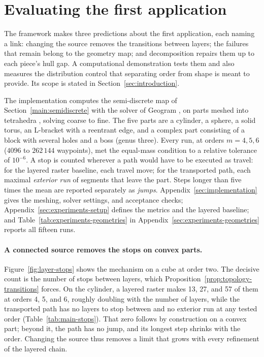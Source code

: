 \section{Evaluating the first application}
\label{main:evidence}

The framework makes three predictions about the first application, each naming a link: changing the source removes the transitions between layers; the failures that remain belong to the geometry map; and decomposition repairs them up to each piece's hull gap. A computational demonstration tests them and also measures the distribution control that separating order from shape is meant to provide. Its scope is stated in Section~\ref{sec:introduction}.

The implementation computes the semi-discrete map of Section~\ref{main:semidiscrete} with the solver of Geogram \cite{levy2015numerical,kitagawa2019convergence}, on parts meshed into tetrahedra \cite{si2015tetgen}, solving coarse to fine. The five parts are a cylinder, a sphere, a solid torus, an L-bracket with a reentrant edge, and a complex part consisting of a block with several holes and a boss (genus three). Every run, at orders $m=4,5,6$ ($4096$ to $262\,144$ waypoints), met the equal-mass condition to a relative tolerance of $10^{-6}$. A stop is counted wherever a path would have to be executed as travel: for the layered raster baseline, each travel move; for the transported path, each maximal \emph{exterior run} of segments that leave the part. Steps longer than five times the mean are reported separately as \emph{jumps}. Appendix~\ref{sec:implementation} gives the meshing, solver settings, and acceptance checks; Appendix~\ref{sec:experiments-setup} defines the metrics and the layered baseline; and Table~\ref{tab:experiments-geometries} in Appendix~\ref{sec:experiments-geometries} reports all fifteen runs.

\paragraph{A connected source removes the stops on convex parts.}
Figure~\ref{fig:layer-stops} shows the mechanism on a cube at order two. The decisive count is the number of stops between layers, which Proposition~\ref{prop:topology-transitions} forces. On the cylinder, a layered raster makes 13, 27, and 57 of them at orders 4, 5, and 6, roughly doubling with the number of layers, while the transported path has no layers to stop between and no exterior run at any tested order (Table~\ref{tab:main-stops}). That zero follows by construction on a convex part; beyond it, the path has no jump, and its longest step shrinks with the order. Changing the source thus removes a limit that grows with every refinement of the layered chain.

